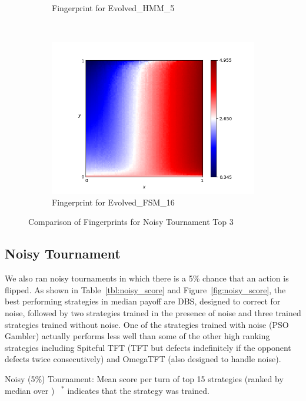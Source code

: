\documentclass{article}
\begin{document}
\begin{figure}[!hbtp]
\begin{subfigure}[t]{.3\textwidth}
        \caption{Fingerprint for Evolved\_HMM\_5}
    \end{subfigure}%
    ~
    \begin{subfigure}[t]{.3\textwidth}
        \centering
        \includegraphics[width=\textwidth]{./assets/Evolved_FSM_16.png}
        \caption{Fingerprint for Evolved\_FSM\_16}
    \end{subfigure}%

    \caption{Comparison of Fingerprints for Noisy Tournament Top 3}
    \label{fig:comparison_fingerprint_noisy}
\end{figure}


\subsection{Noisy Tournament}

We also ran noisy tournaments in which there is a 5\% chance that an action is
flipped. As shown in Table~\ref{tbl:noisy_score} and
Figure~\ref{fig:noisy_score}, the best performing strategies in median payoff
are DBS, designed to correct for noise, followed by two strategies trained in
the presence of noise and three trained strategies trained without noise. One of
the strategies trained with noise (PSO Gambler) actually performs less well than
some of the other high ranking strategies including
Spiteful TFT (TFT but defects indefinitely if the opponent defects twice
consecutively) and OmegaTFT (also designed to handle noise).

\begin{table}[!hbtp]
    \centering
        
        \caption{Noisy (5\%) Tournament: Mean score per turn of top 15 strategies
        (ranked by median over
        \protecttournaments)
        ~$^{*}$ indicates that the strategy was trained.}
        \label{tbl:noisy_score}
\end{table}
\end{document}
